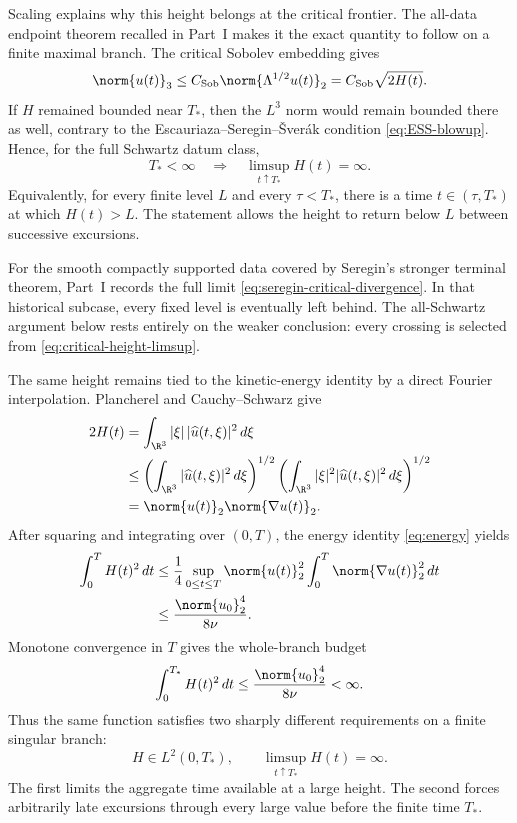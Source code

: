Scaling explains why this height belongs at the critical frontier.  The
all-data endpoint theorem recalled in Part~I makes it the exact quantity to
follow on a finite maximal branch.  The critical Sobolev embedding gives
\begin{equation*}
 \norm{u(t)}_3
 \le C_{\mathrm{Sob}}\norm{\Lambda^{1/2}u(t)}_2
 =C_{\mathrm{Sob}}\sqrt{2H(t)}.
\end{equation*}
If \(H\) remained bounded near \(T_*\), then the \(L^3\) norm would remain
bounded there as well, contrary to the Escauriaza--Seregin--\v{S}ver\'ak
condition \eqref{eq:ESS-blowup}.  Hence, for the full Schwartz datum class,
\begin{equation}
 T_*<\infty
 \quad\Longrightarrow\quad
 \limsup_{t\uparrow T_*}H(t)=\infty.
 \label{eq:critical-height-limsup}
\end{equation}
Equivalently, for every finite level \(L\) and every
\(\tau<T_*\), there is a time \(t\in(\tau,T_*)\) at which \(H(t)>L\).
The statement allows the height to return below \(L\) between successive
excursions.

For the smooth compactly supported data covered by Seregin's stronger
terminal theorem, Part~I records the full limit
\eqref{eq:seregin-critical-divergence}.  In that historical subcase, every
fixed level is eventually left behind.  The all-Schwartz argument below rests
entirely on the weaker conclusion: every crossing is selected from
\eqref{eq:critical-height-limsup}.

The same height remains tied to the kinetic-energy identity by a direct
Fourier interpolation.  Plancherel and Cauchy--Schwarz give
\begin{align*}
 2H(t)
 &=\int_{\R^3}|\xi|\,|\widehat u(t,\xi)|^2\,d\xi
 \\
 &\le
 \left(\int_{\R^3}|\widehat u(t,\xi)|^2\,d\xi\right)^{1/2}
 \left(\int_{\R^3}|\xi|^2|\widehat u(t,\xi)|^2\,d\xi\right)^{1/2}
 \\
 &=\norm{u(t)}_2\norm{\nabla u(t)}_2.
\end{align*}
After squaring and integrating over \((0,T)\), the energy identity
\eqref{eq:energy} yields
\begin{align*}
 \int_0^T H(t)^2\,dt
 &\le \frac14
 \sup_{0\le t\le T}\norm{u(t)}_2^2
 \int_0^T\norm{\nabla u(t)}_2^2\,dt
 \\
 &\le \frac{\norm{u_0}_2^4}{8\nu}.
\end{align*}
Monotone convergence in \(T\) gives the whole-branch budget
\begin{equation}
 \int_0^{T_*}H(t)^2\,dt
 \le \frac{\norm{u_0}_2^4}{8\nu}<\infty.
 \label{eq:critical-height-budget}
\end{equation}
Thus the same function satisfies two sharply different requirements on a
finite singular branch:
\begin{equation*}
 H\in L^2(0,T_*),
 \qquad
 \limsup_{t\uparrow T_*}H(t)=\infty.
\end{equation*}
The first limits the aggregate time available at a large height.  The second
forces arbitrarily late excursions through every large value before the
finite time \(T_*\).

